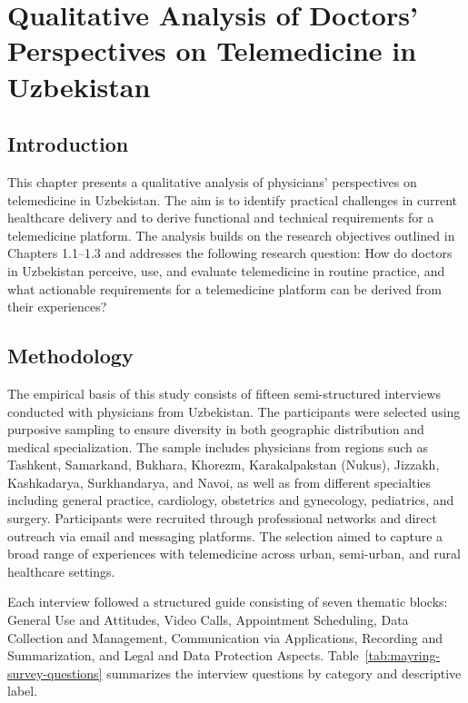 \chapter{Qualitative Analysis of Doctors’ Perspectives on Telemedicine in Uzbekistan}

\section{Introduction}

This chapter presents a qualitative analysis of physicians’ perspectives on telemedicine in Uzbekistan. The aim is to identify practical challenges in current healthcare delivery and to derive functional and technical requirements for a telemedicine platform. The analysis builds on the research objectives outlined in Chapters 1.1--1.3 and addresses the following research question: How do doctors in Uzbekistan perceive, use, and evaluate telemedicine in routine practice, and what actionable requirements for a telemedicine platform can be derived from their experiences?

\section{Methodology}

The empirical basis of this study consists of fifteen semi-structured interviews conducted with physicians from Uzbekistan. The participants were selected using purposive sampling to ensure diversity in both geographic distribution and medical specialization. The sample includes physicians from regions such as Tashkent, Samarkand, Bukhara, Khorezm, Karakalpakstan (Nukus), Jizzakh, Kashkadarya, Surkhandarya, and Navoi, as well as from different specialties including general practice, cardiology, obstetrics and gynecology, pediatrics, and surgery. Participants were recruited through professional networks and direct outreach via email and messaging platforms. The selection aimed to capture a broad range of experiences with telemedicine across urban, semi-urban, and rural healthcare settings.

Each interview followed a structured guide consisting of seven thematic blocks: General Use and Attitudes, Video Calls, Appointment Scheduling, Data Collection and Management, Communication via Applications, Recording and Summarization, and Legal and Data Protection Aspects. Table~\ref{tab:mayring-survey-questions} summarizes the interview questions by category and descriptive label.

